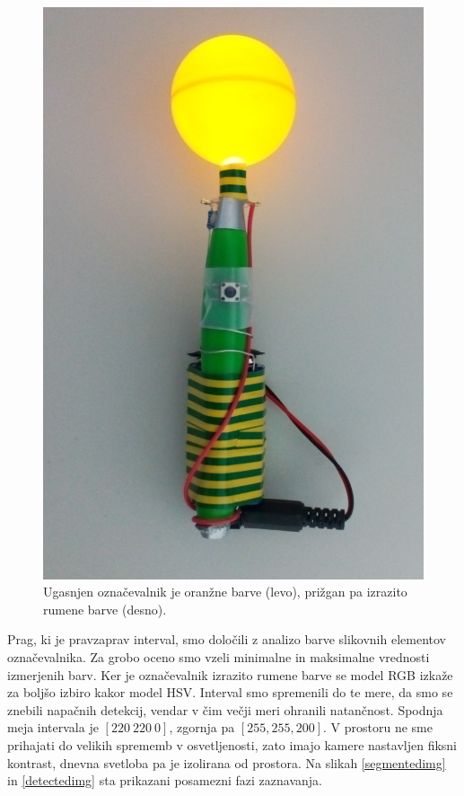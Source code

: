 \documentclass[a4paper, 12pt]{book}
\begin{document}
\begin{figure}[H]
\includegraphics[scale=0.4]{marker_on.png}
\caption{Ugasnjen označevalnik je oranžne barve (levo), prižgan pa izrazito rumene barve (desno).}
\label{markerimg}
\end{figure}

Prag, ki je pravzaprav interval, smo določili z analizo barve slikovnih elementov označevalnika. Za grobo oceno smo vzeli minimalne in maksimalne vrednosti izmerjenih barv. Ker je označevalnik izrazito rumene barve se model RGB izkaže za boljšo izbiro kakor model HSV. Interval smo spremenili do te mere, da smo se znebili napačnih detekcij, vendar v čim večji meri ohranili natančnost. Spodnja meja intervala je $[220 \ 220 \ 0]$, zgornja pa $[255, 255, 200]$. V prostoru ne sme prihajati do velikih sprememb v osvetljenosti, zato imajo kamere nastavljen fiksni kontrast, dnevna svetloba pa je izolirana od prostora. Na slikah \ref{segmentedimg} in \ref{detectedimg} sta prikazani posamezni fazi zaznavanja.
\end{document}
